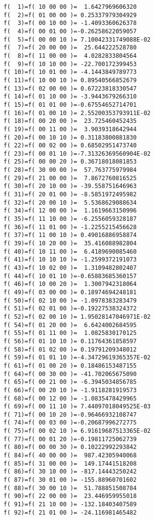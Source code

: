 \begin{footnotesize}
\begin{verbatim}
  f(  1)=f( 10 00 00 )=  1.6427969606320
  f(  2)=f( 01 00 00 )= 0.25337979304929
  f(  3)=f( 00 10 00 )= -1.4093360626378
  f(  4)=f( 00 01 00 )=-0.26258622059057
  f(  5)=f( 00 00 10 )= 7.10042331749088E-02
  f(  7)=f( 20 00 00 )=  25.644222528780
  f(  8)=f( 11 00 00 )=  4.0282833804564
  f(  9)=f( 10 10 00 )= -22.700172399453
  f( 10)=f( 10 01 00 )= -4.1443849789773
  f( 11)=f( 10 00 10 )= 0.89540566852679
  f( 13)=f( 02 00 00 )= 0.67223818330547
  f( 14)=f( 01 10 00 )= -3.9443679266310
  f( 15)=f( 01 01 00 )=-0.67554652714701
  f( 16)=f( 01 00 10 )= 2.55200353793911E-02
  f( 18)=f( 00 20 00 )=  23.725460452435
  f( 19)=f( 00 11 00 )=  3.9039318642944
  f( 20)=f( 00 10 10 )= 0.31183800881830
  f( 22)=f( 00 02 00 )= 0.68502951473740
  f( 23)=f( 00 01 10 )=-7.31326369560904E-02
  f( 25)=f( 00 00 20 )= 0.36718018081853
  f( 28)=f( 30 00 00 )=  57.763775979984
  f( 29)=f( 21 00 00 )=  7.8672760816525
  f( 30)=f( 20 10 00 )= -39.558751646963
  f( 31)=f( 20 01 00 )= -8.5851972495982
  f( 32)=f( 20 00 10 )=  5.5368629088634
  f( 34)=f( 12 00 00 )=  1.1619663150996
  f( 35)=f( 11 10 00 )= -6.2556059328187
  f( 36)=f( 11 01 00 )= -1.2255215456628
  f( 37)=f( 11 00 10 )= 0.49016886958874
  f( 39)=f( 10 20 00 )=  35.416088982804
  f( 40)=f( 10 11 00 )=  6.4189690085460
  f( 41)=f( 10 10 10 )= -1.2599372191073
  f( 43)=f( 10 02 00 )=  1.3109482802407
  f( 44)=f( 10 01 10 )=-0.65883685360157
  f( 46)=f( 10 00 20 )=  1.3007942318064
  f( 49)=f( 03 00 00 )= 0.18974694248181
  f( 50)=f( 02 10 00 )= -1.0978383283479
  f( 51)=f( 02 01 00 )=-0.19227538324372
  f( 52)=f( 02 00 10 )= 1.95028147046971E-02
  f( 54)=f( 01 20 00 )=  6.6424002684595
  f( 55)=f( 01 11 00 )=  1.0825830170125
  f( 56)=f( 01 10 10 )= 0.11764361858597
  f( 58)=f( 01 02 00 )= 0.19791209348012
  f( 59)=f( 01 01 10 )=-4.34729619365357E-02
  f( 61)=f( 01 00 20 )= 0.18486153487155
  f( 64)=f( 00 30 00 )= -41.702065675090
  f( 65)=f( 00 21 00 )= -6.3945034856785
  f( 66)=f( 00 20 10 )= -1.9118281919573
  f( 68)=f( 00 12 00 )= -1.0835478429965
  f( 69)=f( 00 11 10 )= 7.44097018049525E-03
  f( 71)=f( 00 10 20 )=-0.96466932108747
  f( 74)=f( 00 03 00 )=-0.20687996272775
  f( 75)=f( 00 02 10 )= 6.91619687513365E-02
  f( 77)=f( 00 01 20 )=-0.19811725062739
  f( 80)=f( 00 00 30 )= 0.10222992293842
  f( 84)=f( 40 00 00 )=  987.42305940068
  f( 85)=f( 31 00 00 )=  149.17441518208
  f( 86)=f( 30 10 00 )= -817.14443250242
  f( 87)=f( 30 01 00 )= -155.88960701602
  f( 88)=f( 30 00 10 )=  51.788851508784
  f( 90)=f( 22 00 00 )=  23.446959955018
  f( 91)=f( 21 10 00 )= -132.18403407589
  f( 92)=f( 21 01 00 )= -24.116981465482

\end{verbatim}
\end{footnotesize}
